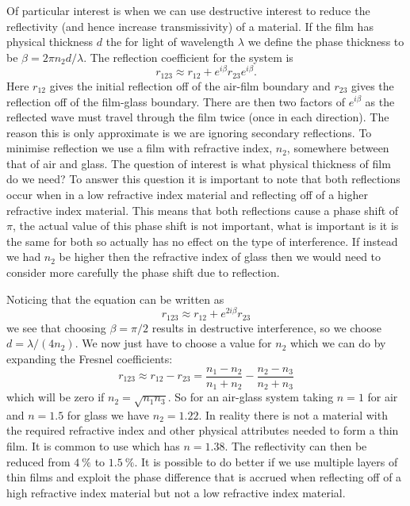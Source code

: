     Of particular interest is when we can use destructive interest to reduce the reflectivity (and hence increase transmissivity) of a material.
    If the film has physical thickness \(d\) the for light of wavelength \(\lambda\) we define the phase thickness to be \(\beta = 2\pi n_2d/\lambda\).
    The reflection coefficient for the system is
    \[r_{123} \approx r_{12} + e^{i\beta}r_{23}e^{i\beta}.\]
    Here \(r_{12}\) gives the initial reflection off of the air-film boundary and \(r_{23}\) gives the reflection off of the film-glass boundary.
    There are then two factors of \(e^{i\beta}\) as the reflected wave must travel through the film twice (once in each direction).
    The reason this is only approximate is we are ignoring secondary reflections.
    To minimise reflection we use a film with refractive index, \(n_2\), somewhere between that of air and glass.
    The question of interest is what physical thickness of film do we need?
    To answer this question it is important to note that both reflections occur when in a low refractive index material and reflecting off of a higher refractive index material.
    This means that both reflections cause a phase shift of \(\pi\), the actual value of this phase shift is not important, what is important is it is the same for both so actually has no effect on the type of interference.
    If instead we had \(n_2\) be higher then the refractive index of glass then we would need to consider more carefully the phase shift due to reflection.
    
    Noticing that the equation can be written as
    \[r_{123} \approx r_{12} + e^{2i\beta}r_{23}\]
    we see that choosing \(\beta = \pi/2\) results in destructive interference, so we choose \(d = \lambda/(4n_2)\).
    We now just have to choose a value for \(n_2\) which we can do by expanding the Fresnel coefficients:
    \[r_{123} \approx r_{12} - r_{23} = \frac{n_1 - n_2}{n_1 + n_2} - \frac{n_2 - n_3}{n_2 + n_3}\]
    which will be zero if \(n_2 = \sqrt{n_1n_3}.\)
    So for an air-glass system taking \(n = 1\) for air and \(n = 1.5\) for glass we have \(n_2 = 1.22\).
    In reality there is not a material with the required refractive index and other physical attributes needed to form a thin film.
    It is common to use  which has \(n = 1.38\).
    The reflectivity can then be reduced from \(\SI{4}{\percent}\) to \(\SI{1.5}{\percent}\).
    It is possible to do better if we use multiple layers of thin films and exploit the phase difference that is accrued when reflecting off of a high refractive index material but not a low refractive index material.
    
